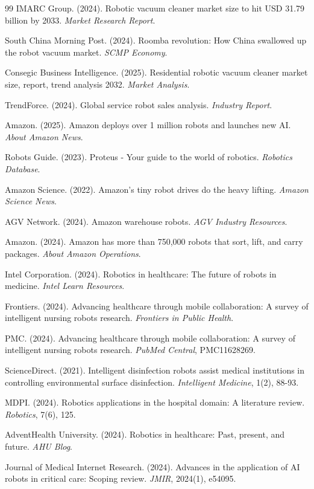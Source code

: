 \documentclass[11pt,a4paper]{article}
\begin{document}
\begin{thebibliography}{99}
IMARC Group. (2024). Robotic vacuum cleaner market size to hit USD 31.79 billion by 2033. \textit{Market Research Report}.

South China Morning Post. (2024). Roomba revolution: How China swallowed up the robot vacuum market. \textit{SCMP Economy}.

Consegic Business Intelligence. (2025). Residential robotic vacuum cleaner market size, report, trend analysis 2032. \textit{Market Analysis}.

TrendForce. (2024). Global service robot sales analysis. \textit{Industry Report}.

Amazon. (2025). Amazon deploys over 1 million robots and launches new AI. \textit{About Amazon News}.

Robots Guide. (2023). Proteus - Your guide to the world of robotics. \textit{Robotics Database}.

Amazon Science. (2022). Amazon's tiny robot drives do the heavy lifting. \textit{Amazon Science News}.

AGV Network. (2024). Amazon warehouse robots. \textit{AGV Industry Resources}.

Amazon. (2024). Amazon has more than 750,000 robots that sort, lift, and carry packages. \textit{About Amazon Operations}.

Intel Corporation. (2024). Robotics in healthcare: The future of robots in medicine. \textit{Intel Learn Resources}.

Frontiers. (2024). Advancing healthcare through mobile collaboration: A survey of intelligent nursing robots research. \textit{Frontiers in Public Health}.

PMC. (2024). Advancing healthcare through mobile collaboration: A survey of intelligent nursing robots research. \textit{PubMed Central}, PMC11628269.

ScienceDirect. (2021). Intelligent disinfection robots assist medical institutions in controlling environmental surface disinfection. \textit{Intelligent Medicine}, 1(2), 88-93.

MDPI. (2024). Robotics applications in the hospital domain: A literature review. \textit{Robotics}, 7(6), 125.

AdventHealth University. (2024). Robotics in healthcare: Past, present, and future. \textit{AHU Blog}.

Journal of Medical Internet Research. (2024). Advances in the application of AI robots in critical care: Scoping review. \textit{JMIR}, 2024(1), e54095.

\end{thebibliography}
\end{document}
